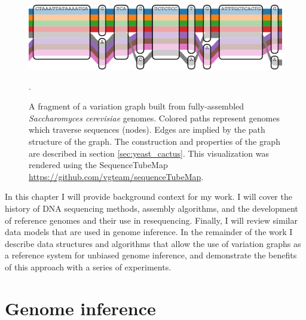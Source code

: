\begin{figure}[htbp!]
  \centering
  \includegraphics[width=1.0\textwidth]{Chapter1/Figs/vg_tubemap.pdf}
  \caption[A variation graph]{
    A fragment of a variation graph built from fully-assembled \emph{Saccharomyces cerevisiae} genomes.
    Colored paths represent genomes which traverse sequences (nodes).
    Edges are implied by the path structure of the graph.
    The construction and properties of the graph are described in section \ref{sec:yeast_cactus}.
    This visualization was rendered using the SequenceTubeMap \url{https://github.com/vgteam/sequenceTubeMap}.
    } 
\label{fig:variation_graph_tubemap}.
\end{figure}

In this chapter I will provide background context for my work.
I will cover the history of DNA sequencing methods, assembly algorithms, and the development of reference genomes and their use in resequencing.
Finally, I will review similar data models that are used in genome inference.
In the remainder of the work I describe data structures and algorithms that allow the use of variation graphs as a reference system for unbiased genome inference, and demonstrate the benefits of this approach with a series of experiments.

\section{Genome inference}

